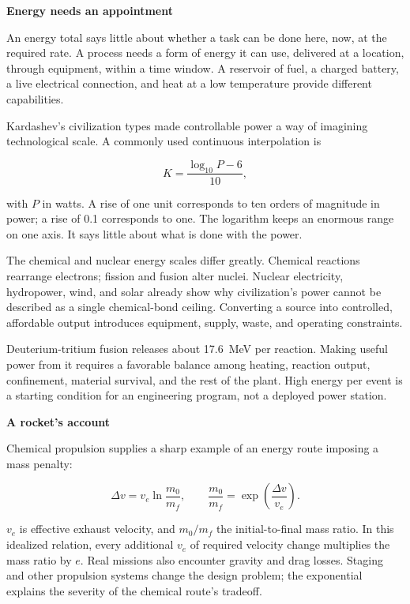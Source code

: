 \documentclass[11pt,openany]{book}
\newcommand{\subhead}[1]{\par\medskip\noindent\textbf{#1}\par\nobreak\smallskip}
\begin{document}
\subhead{Energy needs an appointment}

An energy total says little about whether a task can be done here, now, at the required rate. A process needs a form of energy it can use, delivered at a location, through equipment, within a time window. A reservoir of fuel, a charged battery, a live electrical connection, and heat at a low temperature provide different capabilities.

Kardashev's civilization types made controllable power a way of imagining technological scale.\cite{kardashev1964transmission} A commonly used continuous interpolation is

\begin{equation}
K=\frac{\log_{10}P-6}{10},
\label{eq:kardashev}
\end{equation}

with $P$ in watts. A rise of one unit corresponds to ten orders of magnitude in power; a rise of 0.1 corresponds to one. The logarithm keeps an enormous range on one axis. It says little about what is done with the power.

The chemical and nuclear energy scales differ greatly. Chemical reactions rearrange electrons; fission and fusion alter nuclei. Nuclear electricity, hydropower, wind, and solar already show why civilization's power cannot be described as a single chemical-bond ceiling.\cite{jaffe2018physics,smil2017energy} Converting a source into controlled, affordable output introduces equipment, supply, waste, and operating constraints.

Deuterium-tritium fusion releases about 17.6~MeV per reaction. Making useful power from it requires a favorable balance among heating, reaction output, confinement, material survival, and the rest of the plant.\cite{atzeni2004physics} High energy per event is a starting condition for an engineering program, not a deployed power station.

\subhead{A rocket's account}

Chemical propulsion supplies a sharp example of an energy route imposing a mass penalty:

\begin{equation}
\Delta v=v_e\ln\frac{m_0}{m_f},
\qquad
\frac{m_0}{m_f}=\exp\left(\frac{\Delta v}{v_e}\right).
\end{equation}

$v_e$ is effective exhaust velocity, and $m_0/m_f$ the initial-to-final mass ratio. In this idealized relation, every additional $v_e$ of required velocity change multiplies the mass ratio by $e$. Real missions also encounter gravity and drag losses. Staging and other propulsion systems change the design problem; the exponential explains the severity of the chemical route's tradeoff.
\end{document}
